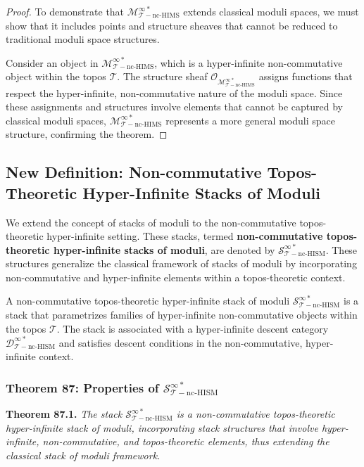 \documentclass{article}
\begin{document}
\begin{proof}
To demonstrate that \(\mathcal{M}_{\mathcal{T}-\text{nc-HIMS}}^{\infty *}\) extends classical moduli spaces, we must show that it includes points and structure sheaves that cannot be reduced to traditional moduli space structures.

Consider an object in \(\mathcal{M}_{\mathcal{T}-\text{nc-HIMS}}^{\infty *}\), which is a hyper-infinite non-commutative object within the topos \(\mathcal{T}\). The structure sheaf \(\mathcal{O}_{\mathcal{M}_{\mathcal{T}-\text{nc-HIMS}}^{\infty *}}\) assigns functions that respect the hyper-infinite, non-commutative nature of the moduli space. Since these assignments and structures involve elements that cannot be captured by classical moduli spaces, \(\mathcal{M}_{\mathcal{T}-\text{nc-HIMS}}^{\infty *}\) represents a more general moduli space structure, confirming the theorem.
\end{proof}

\subsection{New Definition: Non-commutative Topos-Theoretic Hyper-Infinite Stacks of Moduli}
We extend the concept of stacks of moduli to the non-commutative topos-theoretic hyper-infinite setting. These stacks, termed \textbf{non-commutative topos-theoretic hyper-infinite stacks of moduli}, are denoted by \(\mathcal{S}_{\mathcal{T}-\text{nc-HISM}}^{\infty *}\). These structures generalize the classical framework of stacks of moduli by incorporating non-commutative and hyper-infinite elements within a topos-theoretic context.

A non-commutative topos-theoretic hyper-infinite stack of moduli \(\mathcal{S}_{\mathcal{T}-\text{nc-HISM}}^{\infty *}\) is a stack that parametrizes families of hyper-infinite non-commutative objects within the topos \(\mathcal{T}\). The stack is associated with a hyper-infinite descent category \(\mathcal{D}_{\mathcal{T}-\text{nc-HISM}}^{\infty *}\) and satisfies descent conditions in the non-commutative, hyper-infinite context.

\subsubsection{Theorem 87: Properties of \(\mathcal{S}_{\mathcal{T}-\text{nc-HISM}}^{\infty *}\)}
\textbf{Theorem 87.1.} \textit{The stack \(\mathcal{S}_{\mathcal{T}-\text{nc-HISM}}^{\infty *}\) is a non-commutative topos-theoretic hyper-infinite stack of moduli, incorporating stack structures that involve hyper-infinite, non-commutative, and topos-theoretic elements, thus extending the classical stack of moduli framework.}
\end{document}
